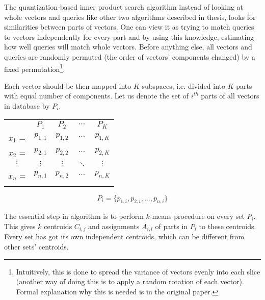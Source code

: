 The quantization-based inner product search algorithm \cite{quantization}
instead of looking at whole vectors and queries like other two algorithms described in thesis,
looks for similarities between parts of vectors.
One can view it as trying to match queries to vectors independently for every part and
by using this knowledge, estimating how well queries will match whole vectors.
Before anything else, all vectors and queries are randomly permuted 
(the order of vectors' components changed)
by a fixed permutation\footnote{
Intuitively, this is done to spread the variance of vectors evenly into each slice
(another way of doing this is to apply a random rotation of each vector). Formal
explanation why this is needed is in the original paper.
}.
\par
Each vector should be then mapped into $K$ subspaces, i.e. divided into $K$ parts with equal number of components.
Let us denote the set of $i^{th}$ parts of all vectors in database by $P_i$.
\begin{center}
\renewcommand{\arraystretch}{1.2}
\begin{tabular}{c|c|c|c|c|}
\multicolumn{1}{r}{} & \multicolumn{1}{c}{$P_{1}$} & \multicolumn{1}{c}{$P_{2}$}
& \multicolumn{1}{c}{$\cdots$} & \multicolumn{1}{c}{$P_{K}$} \\
\hhline{~----}
$x_1$ = & $p_{1,1}$ & $p_{1,2}$ & $\cdots$ & $p_{1,K}$ \\
\hhline{~----}
$x_2$ = & $p_{2,1}$ & $p_{2,2}$ & $\cdots$ & $p_{2,K}$ \\
\hhline{~----}
$\vdots$ & $\vdots$ & $\vdots$ & $\ddots$ & $\vdots$ \\
\hhline{~----}
$x_n$ = & $p_{n,1}$ & $p_{n,2}$ & $\cdots$ & $p_{n,K}$ \\
\hhline{~----}
\end{tabular}
\end{center}

\begin{equation*}
P_i = \{ p_{1,i}, p_{2,i}, \ldots, p_{n,i} \}
\end{equation*}

The essential step in algorithm is to perform $k$-means procedure on every set $P_i$.
This gives $k$ centroids $C_{i,j}$ and assignments $A_{i,l}$ of parts in $P_i$ to these centroids.
Every set has got its own independent centroids, which can be different from other sets' centroids.

